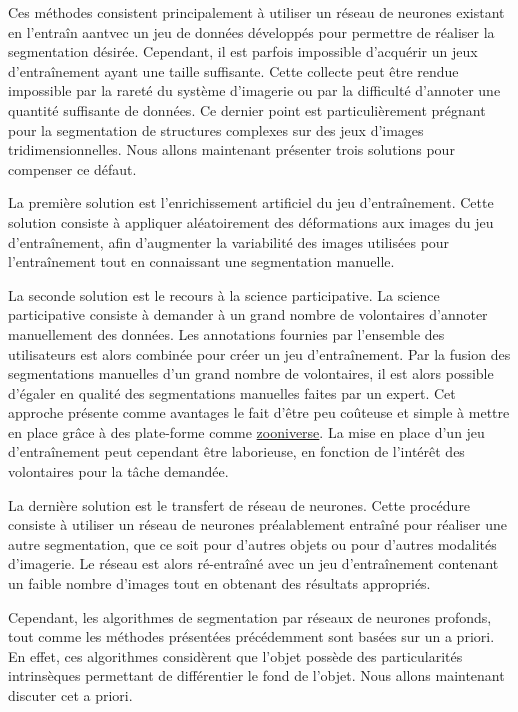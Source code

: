 \documentclass[\main/main.tex]{subfiles}
\begin{document}
%
Ces méthodes consistent principalement à utiliser un réseau de neurones existant
en l'entraîn aantvec un jeu de données développés pour permettre de réaliser la segmentation désirée.
%
Cependant, il est parfois impossible d'acquérir un jeux d'entraînement ayant une taille suffisante.
%
Cette collecte peut être rendue impossible par la rareté du système d'imagerie ou par la difficulté d'annoter une quantité suffisante de données.
%
Ce dernier point est particulièrement prégnant pour la segmentation de structures complexes sur des jeux d'images tridimensionnelles.
%
Nous allons maintenant présenter trois solutions pour compenser ce défaut.

%
La première solution est l'enrichissement artificiel du jeu d'entraînement\cite{milletari_2016,zhao_2019b,majurski_2019}.
%
Cette solution consiste à appliquer aléatoirement des déformations aux images du jeu d'entraînement,
afin d'augmenter la variabilité des images utilisées pour l'entraînement tout en connaissant une segmentation manuelle.

%
La seconde solution est le recours à la science participative\cite{willi_2019,keshavan_2019}.
%
La science participative consiste à demander à un grand nombre de volontaires d'annoter manuellement des données.
%
Les annotations fournies par l'ensemble des utilisateurs est alors combinée pour créer un jeu d'entraînement.
%
Par la fusion des segmentations manuelles d'un grand nombre de volontaires,
il est alors possible d'égaler en qualité des segmentations manuelles faites par un expert\cite{meakin_2019}.
%
Cet approche présente comme avantages le fait d'être peu coûteuse et simple à mettre en place grâce à des plate\hyp{}forme comme \href{https://www.zooniverse.org/}{zooniverse}.
%
La mise en place d'un jeu d'entraînement peut cependant être laborieuse,
en fonction de l'intérêt des volontaires pour la tâche demandée.

%
La dernière solution est le transfert de réseau de neurones.
%
Cette procédure consiste à utiliser un réseau de neurones préalablement entraîné pour réaliser une autre segmentation, que ce soit pour d'autres objets\cite{wahab_2019} ou pour d'autres modalités d'imagerie\cite{guo_2019}.
%
Le réseau est alors ré\hyp{}entraîné avec un jeu d'entraînement contenant un faible nombre d'images tout en obtenant des résultats appropriés.

Cependant, les algorithmes de segmentation par réseaux de neurones profonds, tout comme les méthodes présentées précédemment sont basées sur un a priori.
%
En effet, ces algorithmes considèrent que l'objet possède des particularités intrinsèques permettant de différentier le fond de l'objet.
%
Nous allons maintenant discuter cet a priori.
\end{document}
